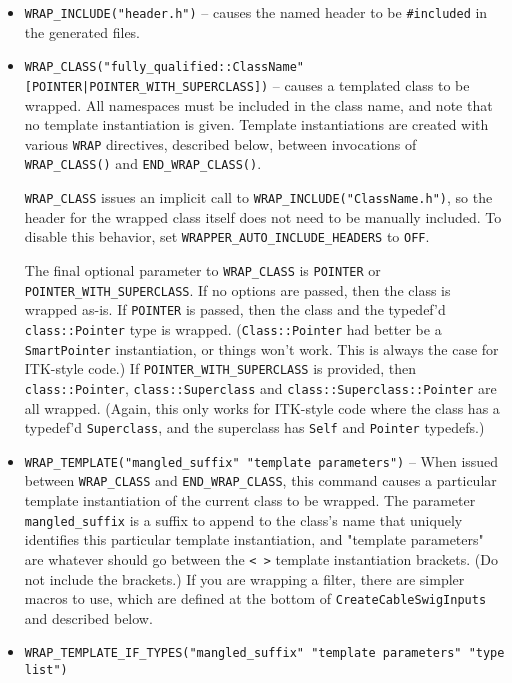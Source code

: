 \documentclass{InsightArticle}
\begin{document}
\begin{itemize}
  \item \verb$WRAP_INCLUDE("header.h")$ -- causes the named header to be \verb$#included$ in the
generated files. 

  \item \verb$WRAP_CLASS("fully_qualified::ClassName" [POINTER|POINTER_WITH_SUPERCLASS])$ --
causes a templated class to be wrapped. All namespaces must be included in the
class name, and note that no template instantiation is given. Template
instantiations are created with various \verb$WRAP$ directives, described below,
between invocations of \verb$WRAP_CLASS()$ and \verb$END_WRAP_CLASS()$.

\verb$WRAP_CLASS$ issues an implicit call to \verb$WRAP_INCLUDE("ClassName.h")$, so the header
for the wrapped class itself does not need to be manually included. To disable
this behavior, set \verb$WRAPPER_AUTO_INCLUDE_HEADERS$ to \verb$OFF$.

The final optional parameter to \verb$WRAP_CLASS$ is \verb$POINTER$ or
\verb$POINTER_WITH_SUPERCLASS$. If no options are passed, then the class is wrapped
as-is. If \verb$POINTER$ is passed, then the class and the typedef'd \verb$class::Pointer$
type is wrapped. (\verb$Class::Pointer$ had better be a \verb$SmartPointer$ instantiation, or
things won't work. This is always the case for ITK-style code.) If
\verb$POINTER_WITH_SUPERCLASS$ is provided, then \verb$class::Pointer$, \verb$class::Superclass$ and
\verb$class::Superclass::Pointer$ are all wrapped. (Again, this only works for
ITK-style code where the class has a typedef'd \verb$Superclass$, and the superclass
has \verb$Self$ and \verb$Pointer$ typedefs.)

  \item \verb$WRAP_TEMPLATE("mangled_suffix" "template parameters")$ -- When issued between \verb$WRAP_CLASS$
and \verb$END_WRAP_CLASS$, this command causes a particular template instantiation of
the current class to be wrapped. The parameter \verb$mangled_suffix$ is a suffix to
append to the class's name that uniquely identifies this particular template
instantiation, and "template parameters" are whatever should go between the \verb$< >$
template instantiation brackets. (Do not include the brackets.) If you are
wrapping a filter, there are simpler macros to use, which are defined at the
bottom of \verb$CreateCableSwigInputs$ and described below.

  \item \verb$WRAP_TEMPLATE_IF_TYPES("mangled_suffix" "template parameters" "type list")$


\end{itemize}
\end{document}

